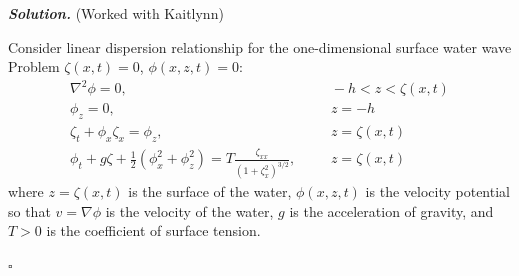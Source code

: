 \documentclass[12pt]{report}
\newenvironment{solution}[1][\it{Solution}]{\textbf{#1. } }{$\square$}
\begin{document}
\begin{solution}
    (Worked with Kaitlynn)

    \noindent
    Consider linear dispersion relationship for the one-dimensional
    surface water wave Problem $\zeta(x,t)=0$, $\phi(x,z,t)=0$:
    \begin{eqnarray*}
    \nabla^2\phi=0,&& ~~~~-h<z<\zeta(x,t)\\
    \phi_z=0, && ~~~~ z=-h\\
    \zeta_t+\phi_x\zeta_x=\phi_z, && ~~~~z=\zeta(x,t)\\
    \phi_t+g\zeta+\frac{1}{2}\left(\phi_x^2+\phi_z^2\right)=
    T\frac{\zeta_{xx}}{\left(1+\zeta_x^2\right)^{3/2}}, && ~~~~z=\zeta(x,t)
    \end{eqnarray*}
    where $z=\zeta(x,t)$ is the surface of the water,
    $\phi(x,z,t)$ is the velocity potential so that $v=\nabla \phi$ is the velocity of the water, $g$ is
    the acceleration of gravity, and $T>0$ is the coefficient of surface tension. 
    

\end{solution}
\end{document}
